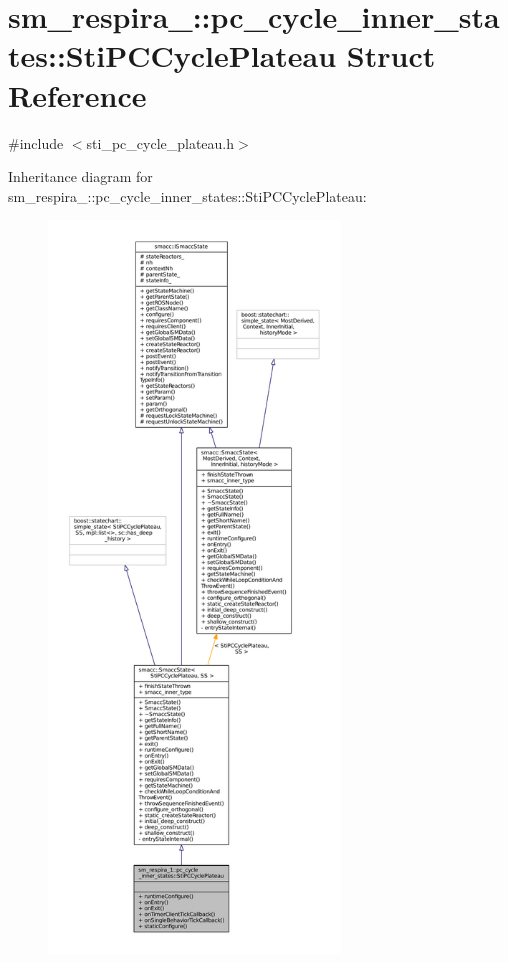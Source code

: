 \hypertarget{structsm__respira__1_1_1pc__cycle__inner__states_1_1StiPCCyclePlateau}{}\section{sm\+\_\+respira\+\_\+:\+:pc\+\_\+cycle\+\_\+inner\+\_\+states\+:\+:Sti\+P\+C\+Cycle\+Plateau Struct Reference}
\label{structsm__respira__1_1_1pc__cycle__inner__states_1_1StiPCCyclePlateau}


{\ttfamily \#include $<$sti\+\_\+pc\+\_\+cycle\+\_\+plateau.\+h$>$}



Inheritance diagram for sm\+\_\+respira\+\_\+:\+:pc\+\_\+cycle\+\_\+inner\+\_\+states\+:\+:Sti\+P\+C\+Cycle\+Plateau\+:
\nopagebreak
\begin{figure}[H]
\begin{center}
\leavevmode
\includegraphics[height=550pt]{structsm__respira__1_1_1pc__cycle__inner__states_1_1StiPCCyclePlateau__inherit__graph}
\end{center}
\end{figure}


